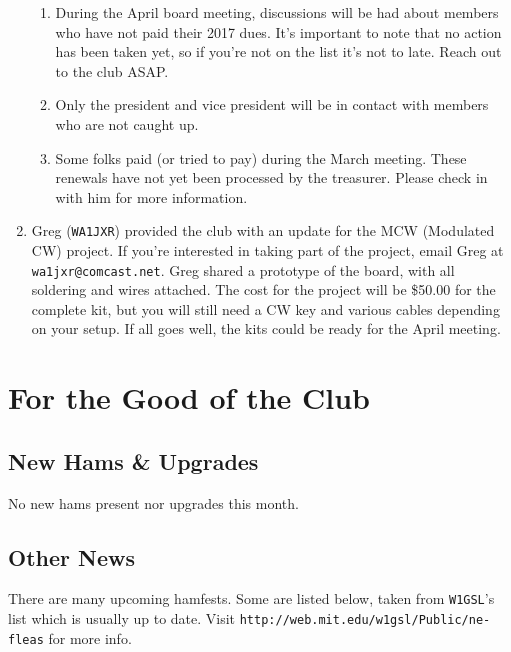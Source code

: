 \documentclass[10pt,letterpaper]{article}
\begin{document}
\begin{enumerate}
\begin{enumerate}
  \item During the April board meeting, discussions will be had about members who have not paid their 2017 dues. It's important to note that no action has been taken yet, so if you're not on the list it's not to late. Reach out to the club ASAP.

  \item Only the president and vice president will be in contact with members who are not caught up.

  \item Some folks paid (or tried to pay) during the March meeting. These renewals have not yet been processed by the treasurer. Please check in with him for more information.

\end{enumerate}
  \newpage
  \item Greg (\texttt{WA1JXR}) provided the club with an update for the MCW (Modulated CW) project. If you're interested in taking part of the project, email Greg at \texttt{wa1jxr@comcast.net}. Greg shared a prototype of the board, with all soldering and wires attached. The cost for the project will be \$50.00 for the complete kit, but you will still need a CW key and various cables depending on your setup. If all goes well, the kits could be ready for the April meeting.
\end{enumerate}

\section{For the Good of the Club}

\subsection{New Hams \& Upgrades}

No new hams present nor upgrades this month.

\subsection{Other News}
There are many upcoming hamfests. Some are listed below, taken from \texttt{W1GSL}'s list which is usually up to date. Visit \texttt{http://web.mit.edu/w1gsl/Public/ne-fleas} for more info.
\end{document}
